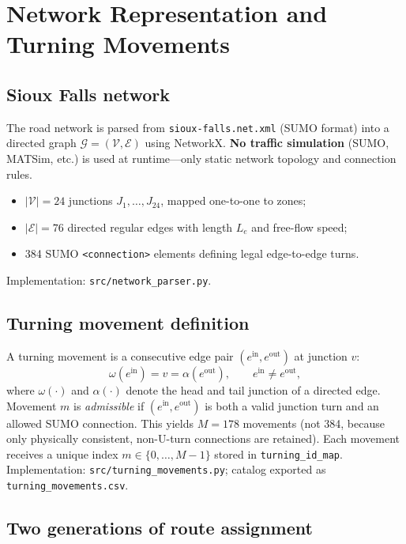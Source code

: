 \documentclass[11pt,a4paper]{report}
\begin{document}
\chapter{Network Representation and Turning Movements}
\label{ch:network}

\section{Sioux Falls network}

The road network is parsed from \texttt{sioux-falls.net.xml} (SUMO format) into a directed graph $\mathcal{G}=(\mathcal{V},\mathcal{E})$ using NetworkX. \textbf{No traffic simulation} (SUMO, MATSim, etc.) is used at runtime---only static network topology and connection rules.

\begin{itemize}[noitemsep]
    \item $|\mathcal{V}|=24$ junctions $J_1,\ldots,J_{24}$, mapped one-to-one to zones;
    \item $|\mathcal{E}|=76$ directed regular edges with length $L_e$ and free-flow speed;
    \item 384 SUMO \texttt{<connection>} elements defining legal edge-to-edge turns.
\end{itemize}
Implementation: \texttt{src/network\_parser.py}.

\section{Turning movement definition}

A turning movement is a consecutive edge pair $(e^{\mathrm{in}},e^{\mathrm{out}})$ at junction $v$:
\begin{equation}
    \omega(e^{\mathrm{in}})=v=\alpha(e^{\mathrm{out}}), \qquad e^{\mathrm{in}}\neq e^{\mathrm{out}},
    \label{eq:turn_def}
\end{equation}
where $\omega(\cdot)$ and $\alpha(\cdot)$ denote the head and tail junction of a directed edge. Movement $m$ is \emph{admissible} if $(e^{\mathrm{in}},e^{\mathrm{out}})$ is both a valid junction turn and an allowed SUMO connection. This yields $M=178$ movements (not 384, because only physically consistent, non-U-turn connections are retained). Each movement receives a unique index $m\in\{0,\ldots,M-1\}$ stored in \texttt{turning\_id\_map}. Implementation: \texttt{src/turning\_movements.py}; catalog exported as \texttt{turning\_movements.csv}.

\section{Two generations of route assignment}
\end{document}
